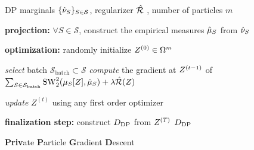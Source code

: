 \begin{figure}[!t]
  \begin{algorithm}[H]
\caption{\textbf{Priv}ate \textbf{P}article \textbf{G}radient \textbf{D}escent }\label{alg:pgd}
\begin{algorithmic}[1]
\Require  DP marginals $ \{\hat \nu_{S}\}_{ S \in \mathcal S}$, regularizer  $\hat {\mathcal R}$ , number of particles $m$ 

\State \textbf{projection:} $\forall S \in \mathcal S$, construct  the empirical measures $ \hat \mu_{S}$ from $ \hat \nu_{S}$ %

 \State \textbf{optimization:} randomly initialize $Z^{(0)} \in \Omega^m$

\State \textit{select} batch $\mathcal S_{\text{batch}} \subset \mathcal S$ 
\State \textit{compute} the gradient at $Z^{(t-1)}$ of 
       $\sum_{S \in \mathcal S_{\text{batch}}} \text{SW}_2^2(\mu_{S}[Z],  \hat \mu_{S}) + \lambda \hat {\mathcal R}(Z)$

\State \textit{update} $Z^{(t)}$ using any first order optimizer

\EndFor
 \State \textbf{finalization step:} construct $D_{\text{DP}}$ from $Z^{(T)}$
 \Statex \Return $D_{\text{DP}}$
\end{algorithmic}
\end{algorithm}
\vspace{-0.3in}
\end{figure}


